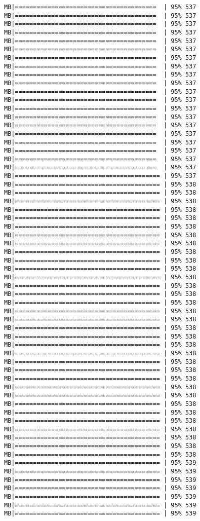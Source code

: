 \documentclass[
]{article}
\begin{document}
\begin{verbatim}
MB|=======================================  | 95% 537 MB|=======================================  | 95% 537 MB|=======================================  | 95% 537 MB|=======================================  | 95% 537 MB|=======================================  | 95% 537 MB|=======================================  | 95% 537 MB|=======================================  | 95% 537 MB|=======================================  | 95% 537 MB|=======================================  | 95% 537 MB|=======================================  | 95% 537 MB|=======================================  | 95% 537 MB|=======================================  | 95% 537 MB|=======================================  | 95% 537 MB|=======================================  | 95% 537 MB|=======================================  | 95% 537 MB|=======================================  | 95% 537 MB|=======================================  | 95% 537 MB|=======================================  | 95% 537 MB|=======================================  | 95% 537 MB|=======================================  | 95% 537 MB|======================================== | 95% 537 MB|======================================== | 95% 538 MB|======================================== | 95% 538 MB|======================================== | 95% 538 MB|======================================== | 95% 538 MB|======================================== | 95% 538 MB|======================================== | 95% 538 MB|======================================== | 95% 538 MB|======================================== | 95% 538 MB|======================================== | 95% 538 MB|======================================== | 95% 538 MB|======================================== | 95% 538 MB|======================================== | 95% 538 MB|======================================== | 95% 538 MB|======================================== | 95% 538 MB|======================================== | 95% 538 MB|======================================== | 95% 538 MB|======================================== | 95% 538 MB|======================================== | 95% 538 MB|======================================== | 95% 538 MB|======================================== | 95% 538 MB|======================================== | 95% 538 MB|======================================== | 95% 538 MB|======================================== | 95% 538 MB|======================================== | 95% 538 MB|======================================== | 95% 538 MB|======================================== | 95% 538 MB|======================================== | 95% 538 MB|======================================== | 95% 538 MB|======================================== | 95% 538 MB|======================================== | 95% 538 MB|======================================== | 95% 538 MB|======================================== | 95% 538 MB|======================================== | 95% 538 MB|======================================== | 95% 539 MB|======================================== | 95% 539 MB|======================================== | 95% 539 MB|======================================== | 95% 539 MB|======================================== | 95% 539 MB|======================================== | 95% 539 MB|======================================== | 95% 539 
\end{verbatim}
\end{document}
